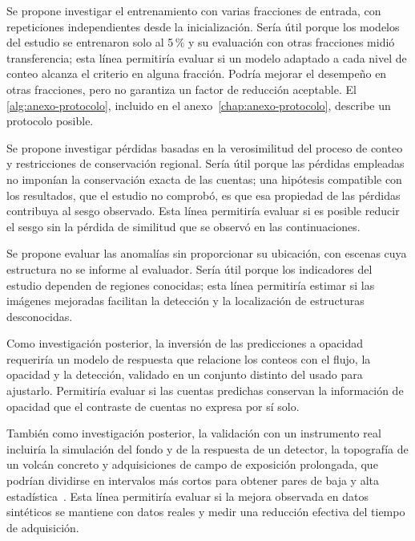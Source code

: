 Se propone investigar el entrenamiento con varias fracciones de entrada, con repeticiones independientes desde la inicialización. Sería útil porque los modelos del estudio se entrenaron solo al 5\,\% y su evaluación con otras fracciones midió transferencia; esta línea permitiría evaluar si un modelo adaptado a cada nivel de conteo alcanza el criterio en alguna fracción. Podría mejorar el desempeño en otras fracciones, pero no garantiza un factor de reducción aceptable. El \cref{alg:anexo-protocolo}, incluido en el anexo~\ref{chap:anexo-protocolo}, describe un protocolo posible.

Se propone investigar pérdidas basadas en la verosimilitud del proceso de conteo y restricciones de conservación regional. Sería útil porque las pérdidas empleadas no imponían la conservación exacta de las cuentas; una hipótesis compatible con los resultados, que el estudio no comprobó, es que esa propiedad de las pérdidas contribuya al sesgo observado. Esta línea permitiría evaluar si es posible reducir el sesgo sin la pérdida de similitud que se observó en las continuaciones.

Se propone evaluar las anomalías sin proporcionar su ubicación, con escenas cuya estructura no se informe al evaluador. Sería útil porque los indicadores del estudio dependen de regiones conocidas; esta línea permitiría estimar si las imágenes mejoradas facilitan la detección y la localización de estructuras desconocidas.

Como investigación posterior, la inversión de las predicciones a opacidad requeriría un modelo de respuesta que relacione los conteos con el flujo, la opacidad y la detección, validado en un conjunto distinto del usado para ajustarlo. Permitiría evaluar si las cuentas predichas conservan la información de opacidad que el contraste de cuentas no expresa por sí solo.

También como investigación posterior, la validación con un instrumento real incluiría la simulación del fondo y de la respuesta de un detector, la topografía de un volcán concreto y adquisiciones de campo de exposición prolongada, que podrían dividirse en intervalos más cortos para obtener pares de baja y alta estadística~\parencite{lesparre2010,lechmann2021}. Esta línea permitiría evaluar si la mejora observada en datos sintéticos se mantiene con datos reales y medir una reducción efectiva del tiempo de adquisición.

\FloatBarrier
